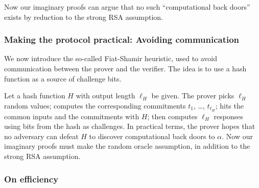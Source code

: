 Now our imaginary proofs can argue that no such ``computational
back doors'' exists by reduction to the strong RSA assumption.

\subsubsection{Making the protocol practical: Avoiding communication}

We now introduce the so-called Fiat-Shamir heuristic, used to avoid
communication between the prover and the verifier.
The idea is to use a hash function as a source of challenge bits.

Let a hash function $H$ with output length $\ell_H$ be given.
The prover picks $\ell_H$ random values; computes the corresponding
commitments $t_1$, \ldots, $t_{\ell_H}$;
hits the common inputs and the commitments with $H$;
then computes $\ell_H$ responses using bits from
the hash as challenges. In practical terms, the prover hopes
that no adversary can defeat $H$ to discover
computational back doors to $\alpha$. Now our imaginary proofs must
make the random oracle assumption, in addition to the strong
RSA assumption.

\subsubsection{On efficiency}

\begin{comment}
	\emph{PDS:}
	Explain that we described the only ``cut and choose'' protocol
	used in DAA. All the other zero-knowledge proofs enjoy
	efficient protocols. Like the preceding protocol, they use
	the Fiat-Shamir heuristic. Unlike the preceding protocol,
	they avoid computing $\ell_H$ commitments and $\ell_H$ responses.
	Offer pointers to the literature. Discussion is beyond the scope of this report.
\end{comment}
